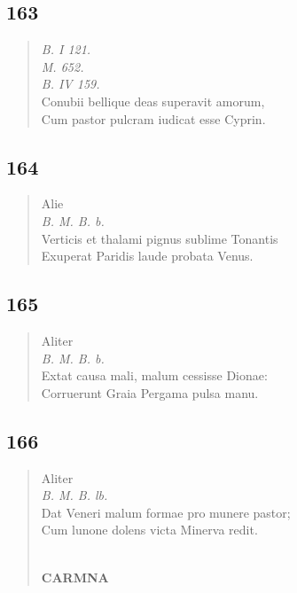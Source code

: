 \documentclass[11pt, a4paper]{report}
\begin{document}
            \subsection*{163}
      \begin{verse}
      \textit{B. I 121.} \\ \textit{M. 652.} \\ \textit{B. IV 159.} \\ Conubii bellique deas superavit amorum, \\ Cum pastor pulcram iudicat esse Cyprin. \\ 
      \end{verse}
  
            \subsection*{164}
      \begin{verse}
       \lbrack Alie \rbrack  \\ \textit{B. M. B. b.} \\ Verticis et thalami pignus sublime Tonantis \\ Exuperat Paridis laude probata Venus. \\ 
      \end{verse}
  
            \subsection*{165}
      \begin{verse}
       \lbrack Aliter \rbrack  \\ \textit{B. M. B. b.} \\ Extat causa mali, malum cessisse Dionae: \\ Corruerunt Graia Pergama pulsa manu. \\ 
      \end{verse}
  
            \subsection*{166}
      \begin{verse}
       \lbrack Aliter \rbrack  \\ \textit{B. M. B. lb.} \\ Dat Veneri malum formae pro munere pastor; \\ Cum lunone dolens victa Minerva redit. \\ 
        ﻿\pagebreak 
     \marginpar{[150]} \begin{center} \textbf{CARMNA} \end{center}
      \end{verse}
  
\end{document}
